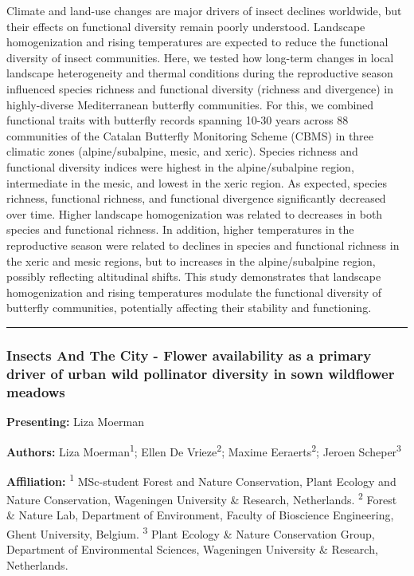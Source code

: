 \documentclass[
  letterpaper,
  DIV=11,
  numbers=noendperiod]{scrartcl}
\begin{document}
Climate and land-use changes are major drivers of insect declines
worldwide, but their effects on functional diversity remain poorly
understood. Landscape homogenization and rising temperatures are
expected to reduce the functional diversity of insect communities. Here,
we tested how long-term changes in local landscape heterogeneity and
thermal conditions during the reproductive season influenced species
richness and functional diversity (richness and divergence) in
highly-diverse Mediterranean butterfly communities. For this, we
combined functional traits with butterfly records spanning 10-30 years
across 88 communities of the Catalan Butterfly Monitoring Scheme (CBMS)
in three climatic zones (alpine/subalpine, mesic, and xeric). Species
richness and functional diversity indices were highest in the
alpine/subalpine region, intermediate in the mesic, and lowest in the
xeric region. As expected, species richness, functional richness, and
functional divergence significantly decreased over time. Higher
landscape homogenization was related to decreases in both species and
functional richness. In addition, higher temperatures in the
reproductive season were related to declines in species and functional
richness in the xeric and mesic regions, but to increases in the
alpine/subalpine region, possibly reflecting altitudinal shifts. This
study demonstrates that landscape homogenization and rising temperatures
modulate the functional diversity of butterfly communities, potentially
affecting their stability and functioning.

\begin{center}\rule{0.5\linewidth}{0.5pt}\end{center}

\subsubsection{Insects And The City - Flower availability as a primary
driver of urban wild pollinator diversity in sown wildflower
meadows}\label{insects-and-the-city---flower-availability-as-a-primary-driver-of-urban-wild-pollinator-diversity-in-sown-wildflower-meadows}

\textbf{Presenting:} Liza Moerman

\textbf{Authors:} Liza Moerman\textsuperscript{1}; Ellen De
Vrieze\textsuperscript{2}; Maxime Eeraerts\textsuperscript{2}; Jeroen
Scheper\textsuperscript{3}

\textbf{Affiliation:} \textsuperscript{1} MSc-student Forest and Nature
Conservation, Plant Ecology and Nature Conservation, Wageningen
University \& Research, Netherlands. \textsuperscript{2} Forest \&
Nature Lab, Department of Environment, Faculty of Bioscience
Engineering, Ghent University, Belgium. \textsuperscript{3} Plant
Ecology \& Nature Conservation Group, Department of Environmental
Sciences, Wageningen University \& Research, Netherlands.
\end{document}
